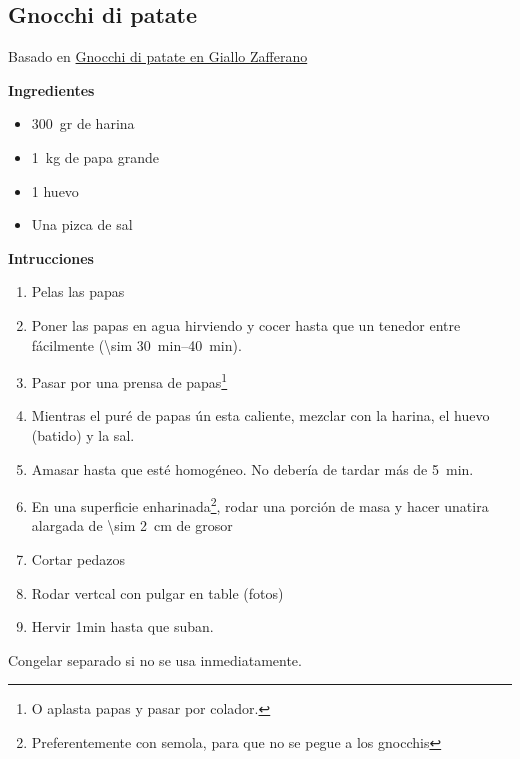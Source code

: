 \subsection{Gnocchi di patate}

Basado en \href{https://ricette.giallozafferano.it/Gnocchi-di-patate.html}{Gnocchi di patate en Giallo Zafferano}

\textbf{Ingredientes}
\begin{itemize}
\item \SI{300}{gr} de harina
\item \SI{1}{kg} de papa grande
\item 1 huevo
\item Una pizca de sal
\end{itemize}

\textbf{Intrucciones}
\begin{enumerate}
\item Pelas las papas
\item Poner las papas en agua hirviendo y cocer hasta que un tenedor entre fácilmente (\SIrange{\sim 30}{40}{min}).
\item Pasar por una prensa de papas\footnote{O aplasta papas y pasar por colador.}
\item Mientras el puré de papas ún esta caliente, mezclar con la harina, el huevo (batido) y la sal. 
\item Amasar hasta que esté homogéneo. No debería de tardar más de \SI{5}{min}.
\item En una superficie enharinada\footnote{Preferentemente con semola, para que no se pegue a los gnocchis}, rodar una porción de masa y hacer unatira alargada de \SI{\sim 2}{cm} de grosor
\item Cortar pedazos 
\item Rodar vertcal con pulgar en table (fotos)
\item Hervir 1min hasta que suban.
\end{enumerate}


Congelar separado si no se usa inmediatamente.